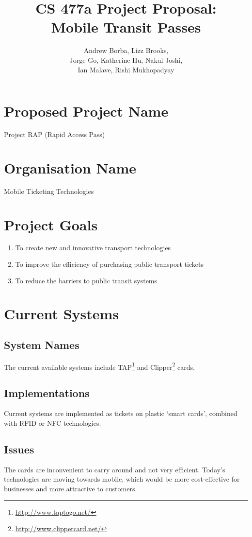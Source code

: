 \documentclass[]{article}
\title{CS 477a Project Proposal: \\Mobile Transit Passes}
\date{}
\author{
	Andrew Borba,
	Lizz Brooks,\\
	Jorge Go,
	Katherine Hu,
	Nakul Joshi,\\
	Ian Malave,
	Rishi Mukhopadyay
}
\begin{document}
\maketitle

\section{Proposed Project Name}
Project RAP (Rapid Access Pass)

\section{Organisation Name}
Mobile Ticketing Technologies

\section{Project Goals}
\begin{enumerate}
	\item To create new and innovative transport technologies
	\item To improve the efficiency of purchasing public transport tickets
	\item To reduce the barriers to public transit systems
\end{enumerate}

\section{Current Systems}
	\subsection{System Names}
		The current available systems include TAP\footnote{\url{http://www.taptogo.net/}} and Clipper\footnote{\url{http://www.clippercard.net/}} cards.
	\subsection{Implementations}
		Current systems are implemented as tickets on plastic `smart cards', combined with RFID or NFC technologies.
	\subsection{Issues}
		The cards are inconvenient to carry around and not very efficient. Today's technologies are moving towards mobile, which would be more cost-effective for businesses and more attractive to customers.
\end{document}

